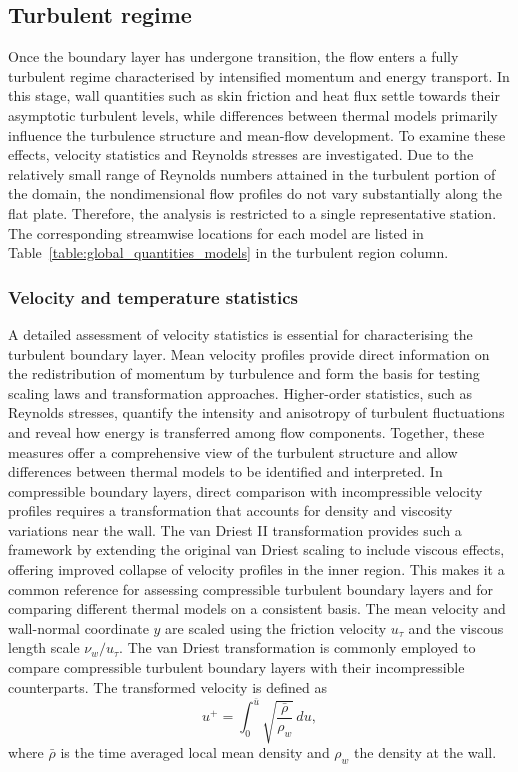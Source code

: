 \subsection{Turbulent regime}
Once the boundary layer has undergone transition, the flow enters a fully turbulent regime characterised by intensified momentum and energy transport. In this stage, wall quantities such as skin friction and heat flux settle towards their asymptotic turbulent levels, while differences between thermal models primarily influence the turbulence structure and mean-flow development. To examine these effects, velocity statistics and Reynolds stresses are investigated. Due to the relatively small range of Reynolds numbers attained in the turbulent portion of the domain, the nondimensional flow profiles do not vary substantially along the flat plate. Therefore, the analysis is restricted to a single representative station. The corresponding streamwise locations for each model are listed in Table~\ref{table:global_quantities_models} in the turbulent region column.



\subsubsection{Velocity and temperature statistics}
A detailed assessment of velocity statistics is essential for characterising the turbulent boundary layer. Mean velocity profiles provide direct information on the redistribution of momentum by turbulence and form the basis for testing scaling laws and transformation approaches. Higher-order statistics, such as Reynolds stresses, quantify the intensity and anisotropy of turbulent fluctuations and reveal how energy is transferred among flow components. Together, these measures offer a comprehensive view of the turbulent structure and allow differences between thermal models to be identified and interpreted. In compressible boundary layers, direct comparison with incompressible velocity profiles requires a transformation that accounts for density and viscosity variations near the wall. The van Driest II transformation provides such a framework by extending the original van Driest scaling to include viscous effects, offering improved collapse of velocity profiles in the inner region. This makes it a common reference for assessing compressible turbulent boundary layers and for comparing different thermal models on a consistent basis.  The mean velocity and wall-normal coordinate $y$ are scaled using the friction velocity $u_{\tau}$ and the viscous length scale $\nu_w/u_{\tau}$. The van Driest transformation is commonly employed to compare compressible turbulent boundary layers with their incompressible counterparts. The transformed velocity is defined as  
\begin{equation}
    u^{+} = \int_{0}^{\bar{u}} \sqrt{\frac{\bar{\rho}}{\rho_w}} \, du ,
\end{equation}
where $\bar{\rho}$ is the time averaged local mean density and $\rho_w$ the density at the wall.  

